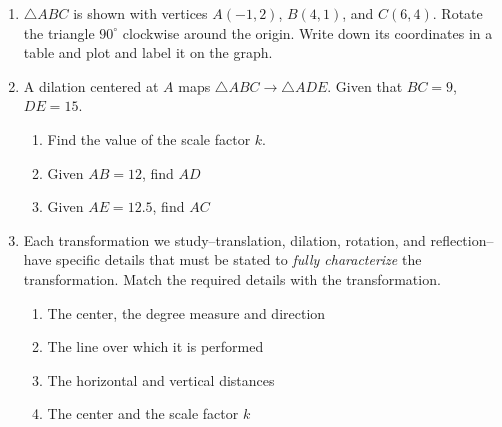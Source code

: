 \documentclass[12pt, twoside]{article}
\begin{document}
\begin{enumerate}
\newpage
\item $\triangle ABC$ is shown with vertices $A(-1,2)$, $B(4,1)$, and $C(6,4)$. Rotate the triangle $90^\circ$ clockwise around the origin. Write down its coordinates in a table and plot and label it on the graph.
  \begin{flushright}
    \end{flushright}


\newpage
\item A dilation centered at $A$ maps $\triangle ABC \rightarrow \triangle ADE$. Given that $BC = 9$, $DE = 15$.
  \begin{enumerate}[itemsep=1.5cm]
    \item Find the value of the scale factor $k$.
    \item Given $AB=12$, find $AD$
    \item Given $AE=12.5$, find $AC$
  \end{enumerate}
    \begin{flushright}
    \end{flushright}

\newpage
\item Each transformation we study--translation, dilation, rotation, and reflection--have specific details that must be stated to \emph{fully characterize} the transformation. Match the required details with the transformation.
\begin{enumerate}[itemsep=0.5cm]
  \item The center, the degree measure and direction
  \item The line over which it is performed
  \item The horizontal and vertical distances
  \item The center and the scale factor $k$
\end{enumerate}


\end{enumerate}
\end{document}
